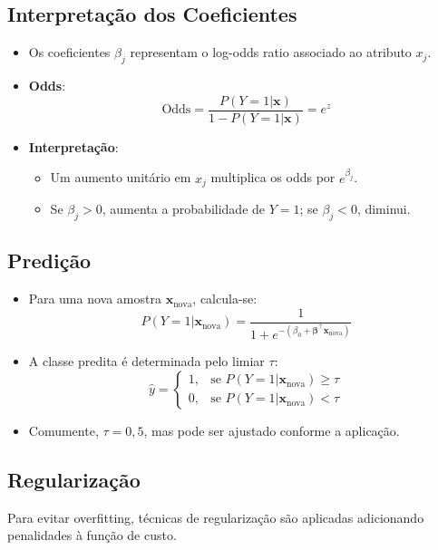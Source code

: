\documentclass{sciposter}
\begin{document}
\begin{multicols}{3}
\subsection{Interpretação dos Coeficientes}

\begin{itemize}
    \item Os coeficientes $\beta_j$ representam o log-odds ratio associado ao atributo $x_j$.
    \item \textbf{Odds}:
    \[
    \text{Odds} = \frac{P(Y=1|\mathbf{x})}{1 - P(Y=1|\mathbf{x})} = e^{z}
    \]
    \item \textbf{Interpretação}:
    \begin{itemize}
        \item Um aumento unitário em $x_j$ multiplica os odds por $e^{\beta_j}$.
        \item Se $\beta_j > 0$, aumenta a probabilidade de $Y=1$; se $\beta_j < 0$, diminui.
    \end{itemize}
\end{itemize}

\subsection{Predição}

\begin{itemize}
    \item Para uma nova amostra $\mathbf{x}_{\text{nova}}$, calcula-se:
    \[
    P(Y=1|\mathbf{x}_{\text{nova}}) = \frac{1}{1 + e^{-(\beta_0 + \mathbf{\beta}^\top \mathbf{x}_{\text{nova}})}}
    \]
    \item A classe predita é determinada pelo limiar $\tau$:
    \[
    \hat{y} = 
    \begin{cases}
        1, & \text{se } P(Y=1|\mathbf{x}_{\text{nova}}) \geq \tau \\
        0, & \text{se } P(Y=1|\mathbf{x}_{\text{nova}}) < \tau
    \end{cases}
    \]
    \item Comumente, $\tau = 0{,}5$, mas pode ser ajustado conforme a aplicação.
\end{itemize}

\subsection{Regularização}

Para evitar overfitting, técnicas de regularização são aplicadas adicionando penalidades à função de custo.


\end{multicols}
\end{document}
